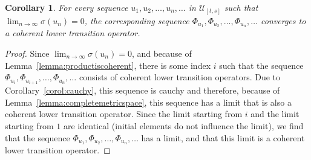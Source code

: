 \documentclass[10pt]{paper}
\newtheorem{corollary}[theorem]{Corollary}
\begin{document}
\begin{corollary}\label{corol:limitexistsandiscoherent}
For every sequence $u_1,u_2,\dots,u_n,\dots$ in $\mathcal{U}_{[t,s]}$ such that $\lim_{n\to\infty}\sigma(u_n)=0$, the corresponding sequence $\Phi_{u_1},\Phi_{u_2},\dots,\Phi_{u_n},\dots$ converges to a coherent lower transition operator.
\end{corollary}
\begin{proof}
Since $\lim_{n\to\infty}\sigma(u_n)=0$, and because of Lemma~\ref{lemma:productiscoherent}, there is some index $i$ such that the sequence $\Phi_{u_i},\Phi_{u_{i+1}},\dots,\Phi_{u_n},\dots$ consists of coherent lower transition operators. Due to Corollary~\ref{corol:cauchy}, this sequence is cauchy and therefore, because of Lemma~\ref{lemma:completemetricspace}, this sequence has a limit that is also a coherent lower transition operator. Since the limit starting from $i$ and the limit starting from $1$ are identical (initial elements do not influence the limit), we find that the sequence $\Phi_{u_1},\Phi_{u_2},\dots,\Phi_{u_n},\dots$ has a limit, and that this limit is a coherent lower transition operator.
\end{proof}
\end{document}
